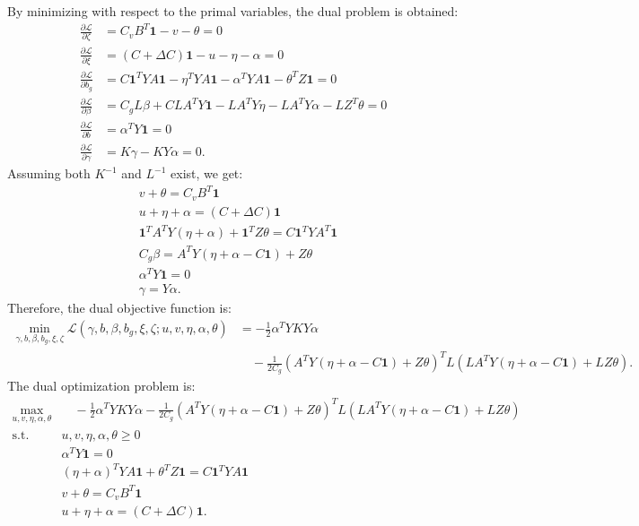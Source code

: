 	By minimizing with respect to the primal variables, the dual problem is obtained:
	\begin{align}
		\frac{\partial \mathcal{L}}{\partial \zeta} &= C_v B^T \mathbf{1} - v - \theta = 0 \\
		\frac{\partial \mathcal{L}}{\partial \xi} &= (C + \Delta C) \mathbf{1} - u - \eta - \alpha = 0 \\
		\frac{\partial \mathcal{L}}{\partial b_g} &= C \mathbf{1}^T Y A \mathbf{1} - \eta^T Y A \mathbf{1} - \alpha^T Y A \mathbf{1} - \theta^T Z \mathbf{1} = 0 \\
		\frac{\partial \mathcal{L}}{\partial \beta} &= C_g L \beta + C L A^T Y \mathbf{1} - L A^T Y \eta - L A^T Y \alpha - L Z^T \theta = 0 \\
		\frac{\partial \mathcal{L}}{\partial b} &= \alpha^T Y \mathbf{1} = 0 \\
		\frac{\partial \mathcal{L}}{\partial \gamma} &= K \gamma - K Y \alpha = 0.
	\end{align}
	Assuming both $K^{-1}$ and $L^{-1}$ exist, we get:
	\begin{align}
		&v + \theta = C_v B^T \mathbf{1} \\
		&u + \eta + \alpha = (C + \Delta C) \mathbf{1} \\
		&\mathbf{1}^T A^T Y (\eta + \alpha) + \mathbf{1}^T Z \theta = C \mathbf{1}^T Y A^T \mathbf{1} \\
		&C_g \beta = A^T Y (\eta + \alpha - C \mathbf{1}) + Z \theta \\
		&\alpha^T Y \mathbf{1} = 0 \\
		&\gamma = Y \alpha.
	\end{align}
	Therefore, the dual objective function is:
	\begin{align}
		\min_{\gamma, b, \beta, b_g, \xi, \zeta} \mathcal{L}(\gamma, b, \beta, b_g, \xi, \zeta; u, v, \eta, \alpha, \theta) &= -\frac{1}{2} \alpha^T Y K Y \alpha \\
		&\quad - \frac{1}{2 C_g} \left( A^T Y (\eta + \alpha - C \mathbf{1}) + Z \theta \right)^T L \left( L A^T Y (\eta + \alpha - C \mathbf{1}) + L Z \theta \right).
	\end{align}
	The dual optimization problem is:
	\begin{subequations}
		\begin{align}
			\max_{u, v, \eta, \alpha, \theta} &\quad -\frac{1}{2} \alpha^T Y K Y \alpha - \frac{1}{2 C_g} \left( A^T Y (\eta + \alpha - C \mathbf{1}) + Z \theta \right)^T L \left( L A^T Y (\eta + \alpha - C \mathbf{1}) + L Z \theta \right) \\
			\text{s.t. } &u, v, \eta, \alpha, \theta \ge 0 \\
			&\alpha^T Y \mathbf{1} = 0 \\
			&(\eta + \alpha)^T Y A \mathbf{1} + \theta^T Z \mathbf{1} = C \mathbf{1}^T Y A \mathbf{1} \\
			&v + \theta = C_v B^T \mathbf{1} \\
			&u + \eta + \alpha = (C + \Delta C) \mathbf{1}.
		\end{align}
	\end{subequations}
